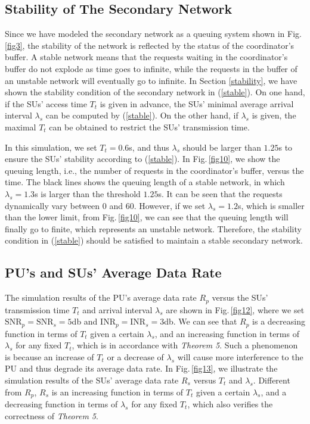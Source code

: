\documentclass[11pt,draftcls]{IEEEtran}{\onecolumn}
\begin{document}
\subsection{Stability of The Secondary Network}

Since we have modeled the secondary network as a queuing system
shown in Fig.\,\ref{fig3}, the stability of the network is reflected
by the status of the coordinator's buffer. A stable network means
that the requests waiting in the coordinator's buffer do not explode
as time goes to infinite, while the requests in the buffer of an
unstable network will eventually go to infinite. In Section
\ref{stability}, we have shown the stability condition of the
secondary network in (\ref{stable}). On one hand, if the SUs' access
time $T_t$ is given in advance, the SUs' minimal average arrival
interval $\lambda_s$ can be computed by (\ref{stable}). On the other
hand, if $\lambda_s$ is given, the maximal $T_t$ can be obtained to
restrict the SUs' transmission time.

In this simulation, we set $T_t=0.6$s, and thus $\lambda_s$
should be larger than $1.25$s to ensure the SUs' stability according
to (\ref{stable}). In Fig.\,\ref{fig10}, we show the queuing length,
i.e., the number of requests in the coordinator's buffer, versus the time.
The black lines shows the queuing length of a
stable network, in which $\lambda_s=1.3$s is larger than the threshold
$1.25$s. It can be seen that the requests dynamically vary between
$0$ and $60$. However, if we set $\lambda_s=1.2$s, which
is smaller than the lower limit, from Fig.\,\ref{fig10}, we can see that the queuing
length will finally go to finite, which represents an unstable
network. Therefore, the stability condition in (\ref{stable}) should
be satisfied to maintain a stable secondary network.

\subsection{PU's and SUs' Average Data Rate}

The simulation results of the PU's average data rate $R_p$ versus
the SUs' transmission time $T_t$ and arrival interval $\lambda_s$
are shown in Fig.\,\ref{fig12}, where we set
$\mbox{SNR}_p\!=\!\mbox{SNR}_s\!=\!5$db and
$\mbox{INR}_p\!=\!\mbox{INR}_s\!=\!3$db. We can see that $R_p$ is a
decreasing function in terms of $T_t$ given a certain $\lambda_s$,
and an increasing function in terms of $\lambda_s$ for any fixed
$T_t$, which is in accordance with \emph{Theorem 5}. Such a
phenomenon is because an increase of $T_t$ or a decrease of
$\lambda_s$ will cause more interference to the PU and thus degrade
its average data rate. In Fig.\,\ref{fig13}, we illustrate the
simulation results of the SUs' average data rate $R_s$ versus $T_t$
and $\lambda_s$. Different from $R_p$, $R_s$ is an increasing
function in terms of $T_t$ given a certain $\lambda_s$, and a
decreasing function in terms of $\lambda_s$ for any fixed $T_t$,
which also verifies the correctness of \emph{Theorem 5}.
\end{document}
